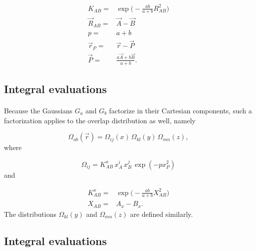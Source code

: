 \documentclass[%
twoside,                 %
final,                   %
10pt]{article}
\begin{document}
\begin{equation}
 \begin{split}
  K_{AB}  = & \exp\Big(-\frac{ab}{a + b}R^2_{AB}\Big) \\
  \vec R_{AB} = &  \vec A - \vec B \\
  p = & a + b\\
  \vec r_P = & \vec r - \vec P \\
  \vec P = & \frac{a\vec A + b\vec B}{a + b}.
 \end{split}
\end{equation}



\subsection{Integral evaluations}

\paragraph{}

Because the Gaussians $G_a$ and $G_b$ factorize in their Cartesian components, such a factorization applies to the overlap distribution
as well, namely

\begin{equation}
 \Omega_{ab}(\vec r) = \Omega_{ij}(x)\,\Omega_{kl}(y)\,\Omega_{mn}(z),
\end{equation}
where

\begin{equation}
 \Omega_{ij} = K^x_{AB}\,x^i_A\,x^j_B\,\exp(-px^2_P)
\end{equation}
and

\begin{equation}
\begin{split}
 K^x_{AB} = & \exp\Big(-\frac{ab}{a + b}X^2_{AB}\Big) \\
   X_{AB} = & A_x - B_x.
\end{split}
\end{equation}
The distributions $\Omega_{kl}(y)$ and $\Omega_{mn}(z)$ are defined similarly.



\subsection{Integral evaluations}

\end{document}
